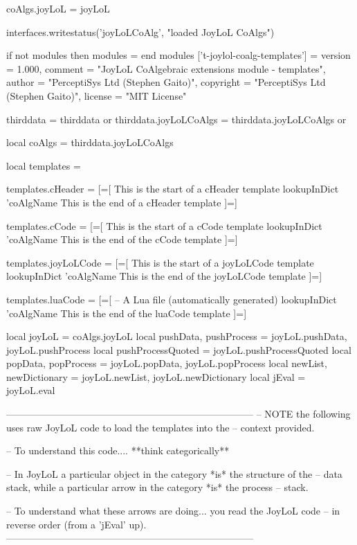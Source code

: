 coAlgs.joyLoL = joyLoL

interfaces.writestatus('joyLoLCoAlg', "loaded JoyLoL CoAlgs")
\stopLuaCode

\startLuaTemplate
if not modules then modules = { } end modules ['t-joylol-coalg-templates'] = {
    version   = 1.000,
    comment   = "JoyLoL CoAlgebraic extensions module - templates",
    author    = "PerceptiSys Ltd (Stephen Gaito)",
    copyright = "PerceptiSys Ltd (Stephen Gaito)",
    license   = "MIT License"
}

thirddata              = thirddata              or {}
thirddata.joyLoLCoAlgs = thirddata.joyLoLCoAlgs or {}

local coAlgs     = thirddata.joyLoLCoAlgs

local templates  = { }

templates.cHeader = [=[
This is the start of a cHeader template
{{ lookupInDict 'coAlgName }}
This is the end of a cHeader template
]=]

templates.cCode = [=[
This is the start of a cCode template
{{ lookupInDict 'coAlgName }}
This is the end of the cCode template
]=]

templates.joyLoLCode = [=[
This is the start of a joyLoLCode template
{{ lookupInDict 'coAlgName }}
This is the end of the joyLoLCode template
]=]

templates.luaCode = [=[
-- A Lua file (automatically generated)
{{ lookupInDict 'coAlgName }}
This is the end of the luaCode template
]=]

local joyLoL = coAlgs.joyLoL
local pushData, pushProcess = joyLoL.pushData, joyLoL.pushProcess
local pushProcessQuoted = joyLoL.pushProcessQuoted
local popData, popProcess   = joyLoL.popData, joyLoL.popProcess
local newList, newDictionary = joyLoL.newList, joyLoL.newDictionary
local jEval = joyLoL.eval

-----------------------------------------------------------------------------
-- NOTE the following uses raw JoyLoL code to load the templates into the 
-- context provided. 

-- To understand this code.... **think categorically**

-- In JoyLoL a particular object in the category *is* the structure of the 
-- data stack, while a particular arrow in the category *is* the process 
-- stack.

-- To understand what these arrows are doing... you read the JoyLoL code 
-- in reverse order (from a 'jEval' up). 
-----------------------------------------------------------------------------

